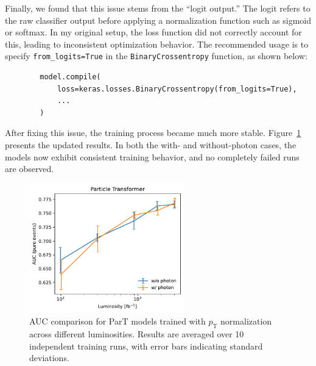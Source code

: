 \documentclass[12pt]{article}
\begin{document}
    Finally, we found that this issue stems from the ``logit output.'' The logit refers to the raw classifier output before applying a normalization function such as sigmoid or softmax. In my original setup, the loss function did not correctly account for this, leading to inconsistent optimization behavior. The recommended usage is to specify \verb|from_logits=True| in the \texttt{BinaryCrossentropy} function, as shown below:
    \begin{verbatim}
        model.compile(
            loss=keras.losses.BinaryCrossentropy(from_logits=True),
            ...
        )
    \end{verbatim}
    After fixing this issue, the training process became much more stable. Figure~\ref{fig:ParT_AUC_various_L_pTnorm_logit} presents the updated results. In both the with- and without-photon cases, the models now exhibit consistent training behavior, and no completely failed runs are observed.
    \begin{figure}[htpb]
        \centering
        \includegraphics[width=0.60\textwidth]{ParT_AUC-true_L-pTnorm_logit.pdf}
        \caption{AUC comparison for ParT models trained with $p_{\text{T}}$ normalization across different luminosities. Results are averaged over 10 independent training runs, with error bars indicating standard deviations.}
        \label{fig:ParT_AUC_various_L_pTnorm_logit}
    \end{figure}



\end{document}
